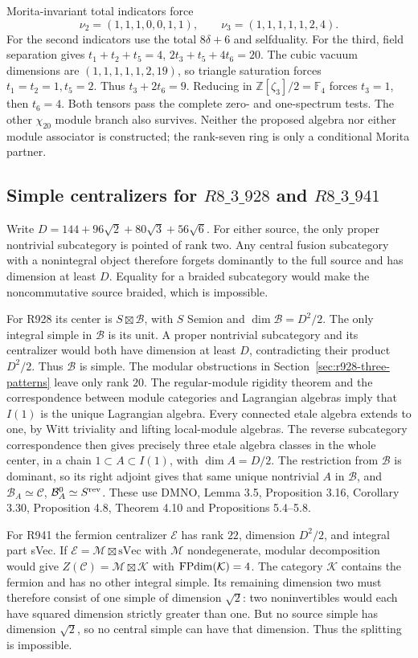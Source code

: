 Morita-invariant total indicators force
\[
\nu_2=(1,1,1,0,0,1,1),\qquad
\nu_3=(1,1,1,1,1,2,4).
\]
For the second indicators use the total $8\delta+6$ and selfduality.
For the third, field separation gives
$t_1+t_2+t_5=4$, $2t_3+t_5+4t_6=20$.
The cubic vacuum dimensions are $(1,1,1,1,1,2,19)$, so triangle
saturation forces $t_1=t_2=1,t_5=2$. Thus $t_3+2t_6=9$.
Reducing in $\mathbb Z[\zeta_3]/2=\mathbb F_4$ forces $t_3=1$,
then $t_6=4$. Both tensors pass the complete zero- and one-spectrum
tests. The other $\chi_{20}$ module branch also survives.
Neither the proposed algebra nor either module associator is constructed;
the rank-seven ring is only a conditional Morita partner.
\subsection{Simple centralizers for $R8\_3\_928$ and $R8\_3\_941$}
Write $D=144+96\sqrt2+80\sqrt3+56\sqrt6$.
For either source, the only proper nontrivial subcategory is pointed of
rank two. Any central fusion subcategory with a nonintegral object
therefore forgets dominantly to the full source and has dimension at
least $D$. Equality for a braided subcategory would make the noncommutative
source braided, which is impossible.

For R928 its center is $S\boxtimes\mathcal B$, with $S$ Semion and
$\dim\mathcal B=D^2/2$. The only integral simple in $\mathcal B$ is its
unit. A proper nontrivial subcategory and its centralizer would both have
dimension at least $D$, contradicting their product $D^2/2$.
Thus $\mathcal B$ is simple. The modular obstructions in Section~\ref{sec:r928-three-patterns} leave only rank $20$.
The regular-module rigidity theorem and the correspondence between module
categories and Lagrangian algebras imply that $I(1)$ is the unique
Lagrangian algebra. Every connected etale algebra extends to one, by
Witt triviality and lifting local-module algebras. The reverse subcategory
correspondence then gives precisely three etale algebra classes in the
whole center, in a chain $1\subset A\subset I(1)$, with $\dim A=D/2$.
The restriction from $\mathcal B$ is dominant, so its right adjoint gives
that same unique nontrivial $A$ in $\mathcal B$, and
$\mathcal B_A\simeq\mathcal C$, $\mathcal B_A^0\simeq S^{\rm rev}$.
These use DMNO, Lemma 3.5, Proposition 3.16, Corollary 3.30,
Proposition 4.8, Theorem 4.10 and Propositions 5.4--5.8.

For R941 the fermion centralizer $\mathcal E$ has rank $22$, dimension
$D^2/2$, and integral part sVec. If
$\mathcal E=\mathcal M\boxtimes\mathrm{sVec}$ with $\mathcal M$
nondegenerate, modular decomposition would give
$Z(\mathcal C)=\mathcal M\boxtimes\mathcal K$ with
$\operatorname{FPdim}(\mathcal K)=4$. The category $\mathcal K$ contains the fermion
and has no other integral simple. Its remaining dimension two must
therefore consist of one simple of dimension $\sqrt2$: two noninvertibles
would each have squared dimension strictly greater than one. But no
source simple has dimension $\sqrt2$, so no central simple can have
that dimension. Thus the splitting is impossible.

